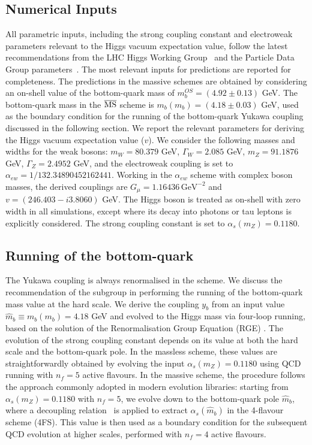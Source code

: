 \documentclass[11pt,a4paper]{article}
\begin{document}
\subsection{Numerical Inputs}
All parametric inputs, including the strong coupling constant and electroweak parameters relevant to the Higgs vacuum expectation value, follow the latest recommendations from the LHC Higgs Working Group~\cite{Karlberg:2024zxx} and the Particle Data Group parameters~\cite{ParticleDataGroup:2024cfk}. The most relevant inputs for \bbH{} predictions are reported for completeness. The predictions in the massive schemes are obtained by considering an on-shell value of the bottom-quark mass of $m_b^{OS}=(4.92\pm0.13)$ GeV. The bottom-quark mass in the $\overline{\text{MS}}{}$ scheme is $m_b(m_b)=(4.18\pm0.03)$ GeV, used as the boundary condition for the running of the bottom-quark Yukawa coupling discussed in the following section. We report the relevant parameters for deriving the Higgs vacuum expectation value ($v$). We consider the following masses and widths for the weak bosons: $m_W = 80.379$ GeV, $\Gamma_W=2.085$ GeV, $m_Z = 91.1876$ GeV, $\Gamma_Z=2.4952$ GeV, and the electroweak coupling is set to $\alpha_{ew}=1/132.34890452162441$. Working in the $\alpha_{ew}$ scheme with complex boson masses, the derived couplings are $G_\mu=1.16436\,\text{GeV}^{-2}$ and $v=(246.403-i3.8060)$ GeV. The Higgs boson is treated as on-shell with zero width in all simulations, except where its decay into photons or tau leptons is explicitly considered. The strong coupling constant is set to $\alpha_s(m_Z)=0.1180$.

\subsection{Running of the bottom-quark}
The Yukawa coupling is always renormalised in the \MSbar{} scheme. We discuss the recommendation of the \bbH{} subgroup in performing the running of the bottom-quark mass value at the hard scale. We derive the coupling $y_b$ from an input value $\hat m_b\equiv m_b(m_b)=4.18$ GeV and evolved to the Higgs mass via four-loop running, based on the solution of the Renormalisation Group Equation (RGE) \cite{harlander:2002wh,baikov_2014}. The evolution of the strong coupling constant depends on its value at both the hard scale and the bottom-quark pole. In the massless scheme, these values are straightforwardly obtained by evolving the input $\alpha_s(m_Z) = 0.1180$ using QCD running with $n_f = 5$ active flavours. In the massive scheme, the procedure follows the approach commonly adopted in modern evolution libraries: starting from $\alpha_s(m_Z) = 0.1180$ with $n_f = 5$, we evolve down to the bottom-quark pole $\hat{m}_b$, where a decoupling relation~\cite{vogt:2004ns} is applied to extract $\alpha_s(\hat{m}_b)$ in the 4-flavour scheme (4FS). This value is then used as a boundary condition for the subsequent QCD evolution at higher scales, performed with $n_f = 4$ active flavours.
\end{document}
